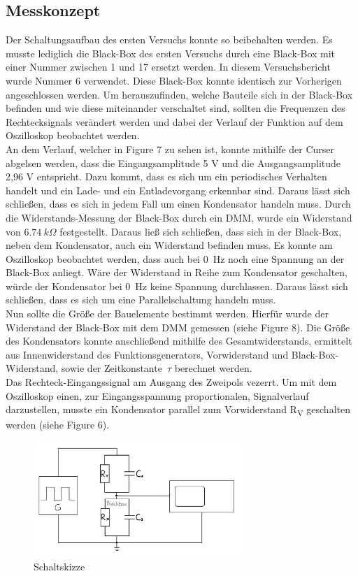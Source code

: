 \documentclass[a4paper,12pt]{article}
\begin{document}
\subsection{Messkonzept}
Der Schaltungsaufbau des ersten Versuchs konnte so beibehalten werden. Es musste lediglich die Black-Box des ersten Versuchs durch eine Black-Box mit einer Nummer zwischen 1 und 17 ersetzt werden. In diesem Versuchsbericht wurde Nummer 6 verwendet. Diese Black-Box konnte identisch zur Vorherigen angeschlossen werden. Um herauszufinden, welche Bauteile sich in der Black-Box befinden und wie diese miteinander verschaltet sind, sollten die Frequenzen des Rechtecksignals verändert werden und dabei der Verlauf der Funktion auf dem Oszilloskop beobachtet werden.\\
An dem Verlauf, welcher in Figure 7 zu sehen ist, konnte mithilfe der Curser abgelsen werden, dass die Eingangsamplitude 5 V und die Ausgangsamplitude 2,96 V entspricht. Dazu kommt, dass es sich um ein periodisches Verhalten handelt und ein Lade- und ein Entladevorgang erkennbar sind. Daraus lässt sich schließen, dass es sich in jedem Fall um einen Kondensator handeln muss. Durch die Widerstands-Messung der Black-Box durch ein DMM, wurde ein Widerstand von \(6.74~k\Omega\) festgestellt. Daraus ließ sich schließen, dass sich in der Black-Box, neben dem Kondensator, auch ein Widerstand befinden muss. Es konnte am Oszilloskop beobachtet werden, dass auch bei 0~Hz noch eine Spannung an der Black-Box anliegt. Wäre der Widerstand in Reihe zum Kondensator geschalten, würde der Kondensator bei 0~Hz keine Spannung durchlassen. Daraus lässt sich schließen, dass es sich um eine Parallelschaltung handeln muss.
\\Nun sollte die Größe der Bauelemente bestimmt werden. Hierfür wurde der Widerstand der Black-Box mit dem DMM gemessen (siehe Figure 8). Die Größe des Kondensators konnte anschließend mithilfe des Gesamtwiderstands, ermittelt aus Innenwiderstand des Funktionsgenerators, Vorwiderstand und Black-Box-Widerstand, sowie der Zeitkonstante~$\tau$ berechnet werden.\\
\noindent Das Rechteck-Eingangssignal am Ausgang des Zweipols vezerrt. Um mit dem Oszilloskop einen, zur Eingangsspannung proportionalen, Signalverlauf darzustellen, musste ein Kondensator parallel zum Vorwiderstand R\textsubscript{V} geschalten werden (siehe Figure 6).

\begin{figure}[H]
    \centering
    \includegraphics[width=0.7\textwidth]{../Quellen/Labor2/SkizzeVerschaltungWiderstandKondensatorVersuch2.jpeg}
\caption{Schaltskizze}
\end{figure}
\end{document}
